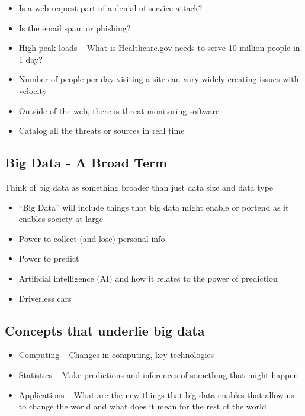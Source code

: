 \documentclass[
]{book}
\providecommand{\tightlist}{%
  \setlength{\itemsep}{0pt}\setlength{\parskip}{0pt}}
\begin{document}
\begin{itemize}
\tightlist
\item
  Is a web request part of a denial of service attack?
\item
  Is the email spam or phishing?
\item
  High peak loads -- What is Healthcare.gov needs to serve 10 million people in 1 day?
\item
  Number of people per day visiting a site can vary widely creating issues with velocity
\item
  Outside of the web, there is threat monitoring software
\item
  Catalog all the threats or sources in real time
\end{itemize}

\subsection{Big Data - A Broad Term}\label{big-data---a-broad-term}

Think of big data as something broader than just data size and data type

\begin{itemize}
\tightlist
\item
  ``Big Data'' will include things that big data might enable or portend as it enables society at large
\item
  Power to collect (and lose) personal info
\item
  Power to predict
\item
  Artificial intelligence (AI) and how it relates to the power of prediction
\item
  Driverless cars
\end{itemize}

\subsection{Concepts that underlie big data}\label{concepts-that-underlie-big-data}

\begin{itemize}
\tightlist
\item
  Computing -- Changes in computing, key technologies
\item
  Statistics -- Make predictions and inferences of something that might happen
\item
  Applications -- What are the new things that big data enables that allow us to change the world and what does it mean for the rest of the world
\end{itemize}
\end{document}
